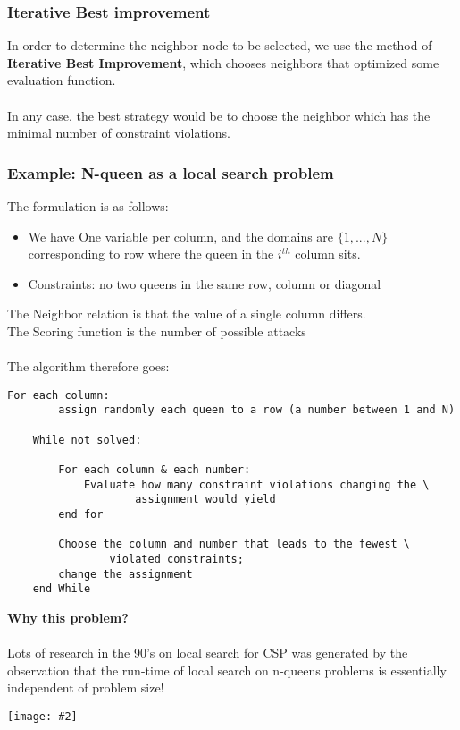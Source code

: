 \documentclass{article}
\def\blu#1{{\color{blu}#1}}
\def\red#1{{\color{red}#1}}
\newcommand{\centerfig}[2]{\begin{center}\texttt{[image: \#2]}\end{center}}
\begin{document}
\subsubsection*{Iterative Best improvement}
In order to determine the neighbor node to be selected, we use the method of \textbf{\blu{Iterative Best Improvement}}, which chooses neighbors that optimized some evaluation function. \\ \\
In any case, the best strategy would be to choose the neighbor which has the minimal number of constraint violations. 

\begin{siderules}
	
	\subsubsection*{Example: N-queen as a local search problem}
	The formulation is as follows:
	\begin{itemize}
		\item We have One variable per column, and the domains are $ \{1,...,N\} $ corresponding to row where the queen in the $ i^{th} $ column sits.
		\item Constraints: no two queens in the same row, column or diagonal
	\end{itemize}
The \red{Neighbor relation} is that the value of a single column differs. \\
The \red{Scoring function} is the number of possible attacks \\ \\
The algorithm therefore goes:
\begin{lstlisting}[tabsize=3]
	For each column:
		assign randomly each queen to a row (a number between 1 and N)
		
	While not solved:
	
		For each column & each number: 
			Evaluate how many constraint violations changing the \
				 	assignment would yield
		end for
		
		Choose the column and number that leads to the fewest \
				violated constraints; 
		change the assignment
	end While
\end{lstlisting}
\textbf{Why this problem?} \\ \\
Lots of research in the 90’s on local search for CSP was generated by the observation that the run-time of local search on n-queens problems is essentially independent of problem size!
	\centerfig{1}{n-queens}
	\end{siderules}
\end{document}
